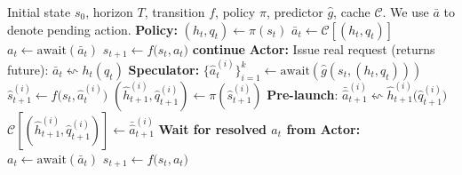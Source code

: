 \begin{algorithm}
\caption{Speculative actions with $k$-way parallel next calls}
\label{alg:speculative-k}
\begin{algorithmic}[1]
\Require Initial state $s_0$, horizon $T$, transition $f$, policy $\pi$, predictor $\hat g$, cache $\mathcal{C}$. We use $\bar{a}$ to denote pending action.
    \State \textbf{Policy:} $(h_t,q_t) \gets \pi(s_t)$
     
        \State $\bar{a}_t \gets \mathcal{C}[(h_t,q_t)]$
        \State $a_t \gets \text{await}(\bar{a}_t)$
        \State $s_{t+1} \gets f\big(s_t,a_t\big)$
        \State \textbf{continue}
    \EndIf
    \State \textbf{Actor:} Issue real request (returns future): $\bar{a}_t \leftsquigarrow h_t(q_t)$
    \State \textbf{Speculator:} 
    $ \{\hat{a}_t^{(i)}\}_{i=1}^k \gets \text{await}(\hat g(s_t,(h_t,q_t)))$
     
        \State $\hat s_{t+1}^{(i)} \gets f\big(s_t, \hat a_t^{(i)}\big)$
        \State $(\hat{h}_{t+1}^{(i)},\hat{q}_{t+1}^{(i)}) \gets \pi(\hat s_{t+1}^{(i)})$
        \State \textbf{Pre-launch}: $\bar{\hat{a}}_{t+1}^{(i)} \leftsquigarrow \hat{h}_{t+1}^{(i)}\!\big(\hat{q}_{t+1}^{(i)}\big)$
        \State \hspace{73pt}  $\mathcal{C}[(\hat{h}_{t+1}^{(i)},\hat{q}_{t+1}^{(i)})] \gets \bar{\hat{a}}_{t+1}^{(i)}$
    \EndFor
    \State \textbf{Wait for resolved $a_t$ from Actor:} $a_t\gets \text{await}(\bar{a}_t)$
    \State $s_{t+1} \gets f\big(s_t,a_t\big)$
\EndFor
\end{algorithmic}
\end{algorithm}


